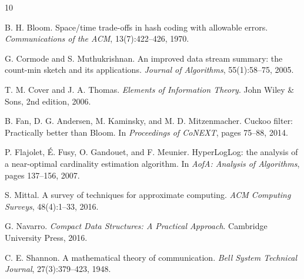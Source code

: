 \documentclass[11pt]{article}
\begin{document}
\begin{thebibliography}{10}

B. H. Bloom.
Space/time trade-offs in hash coding with allowable errors.
\emph{Communications of the ACM}, 13(7):422--426, 1970.

G. Cormode and S. Muthukrishnan.
An improved data stream summary: the count-min sketch and its applications.
\emph{Journal of Algorithms}, 55(1):58--75, 2005.

T. M. Cover and J. A. Thomas.
\emph{Elements of Information Theory}.
John Wiley \& Sons, 2nd edition, 2006.

B. Fan, D. G. Andersen, M. Kaminsky, and M. D. Mitzenmacher.
Cuckoo filter: Practically better than Bloom.
In \emph{Proceedings of CoNEXT}, pages 75--88, 2014.

P. Flajolet, É. Fusy, O. Gandouet, and F. Meunier.
HyperLogLog: the analysis of a near-optimal cardinality estimation algorithm.
In \emph{AofA: Analysis of Algorithms}, pages 137--156, 2007.

S. Mittal.
A survey of techniques for approximate computing.
\emph{ACM Computing Surveys}, 48(4):1--33, 2016.

G. Navarro.
\emph{Compact Data Structures: A Practical Approach}.
Cambridge University Press, 2016.

C. E. Shannon.
A mathematical theory of communication.
\emph{Bell System Technical Journal}, 27(3):379--423, 1948.

\end{thebibliography}
\end{document}
